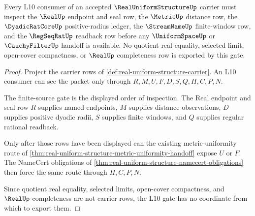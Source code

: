 \begin{theorem}
\label{thm:real-uniform-structure-l10-gate}
Every L10 consumer of an accepted $\RealUniformStructureUp$ carrier must inspect the $\RealUp$ endpoint and seal row, the $\MetricUp$ distance row, the $\DyadicRatCoreUp$ positive-radius ledger, the $\StreamNameUp$ finite-window row, and the $\RegSeqRatUp$ readback row before any $\UniformSpaceUp$ or $\CauchyFilterUp$ handoff is available. No quotient real equality, selected limit, open-cover compactness, or $\RealUp$ completeness row is exported by this gate.
\end{theorem}
\begin{proof}
Project the carrier rows of \autoref{def:real-uniform-structure-carrier}. An L10 consumer can see the packet only through $R,M,U,F,D,S,Q,H,C,P,N$.

The finite-source gate is the displayed order of inspection. The Real endpoint and seal row $R$ supplies named endpoints, $M$ supplies distance observations, $D$ supplies positive dyadic radii, $S$ supplies finite windows, and $Q$ supplies regular rational readback.

Only after those rows have been displayed can the existing metric-uniformity route of \autoref{thm:real-uniform-structure-metric-uniformity-handoff} expose $U$ or $F$. The NameCert obligations of \autoref{thm:real-uniform-structure-namecert-obligations} then force the same route through $H,C,P,N$.

Since quotient real equality, selected limits, open-cover compactness, and $\RealUp$ completeness are not carrier rows, the L10 gate has no coordinate from which to export them.
\end{proof}

